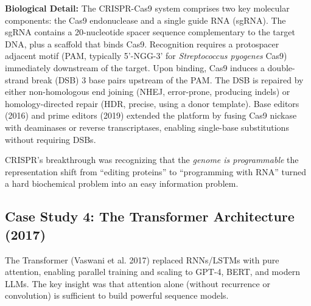 \textbf{Biological Detail:} The CRISPR-Cas9 system comprises two key molecular components: the Cas9 endonuclease and a single guide RNA (sgRNA). The sgRNA contains a 20-nucleotide spacer sequence complementary to the target DNA, plus a scaffold that binds Cas9. Recognition requires a protospacer adjacent motif (PAM, typically 5'-NGG-3' for \emph{Streptococcus pyogenes} Cas9) immediately downstream of the target. Upon binding, Cas9 induces a double-strand break (DSB) 3 base pairs upstream of the PAM. The DSB is repaired by either non-homologous end joining (NHEJ, error-prone, producing indels) or homology-directed repair (HDR, precise, using a donor template). Base editors (2016) and prime editors (2019) extended the platform by fusing Cas9 nickase with deaminases or reverse transcriptases, enabling single-base substitutions without requiring DSBs.

CRISPR's breakthrough was recognizing that the \emph{genome is programmable} the representation shift from ``editing proteins'' to ``programming with RNA'' turned a hard biochemical problem into an easy information problem.

\subsection{Case Study 4: The Transformer Architecture (2017)}

The Transformer (Vaswani et al. 2017) replaced RNNs/LSTMs with pure attention, enabling parallel training and scaling to GPT-4, BERT, and modern LLMs. The key insight was that attention alone (without recurrence or convolution) is sufficient to build powerful sequence models.

